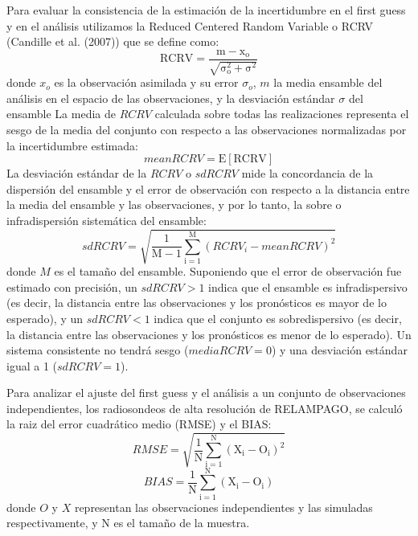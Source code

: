 \documentclass[12pt,twoside]{reedthesis}
\begin{document}
Para evaluar la consistencia de la estimación de la incertidumbre en el first guess y en el análisis utilizamos la Reduced Centered Random Variable o RCRV (Candille et al. (2007)) que se define como:
\begin{equation}
  \mathrm{RCRV = \frac{m - x_o}{\sqrt{\sigma_o^2 + \sigma^2}}}
  \label{eq:eq6}
\end{equation}
donde \(x_o\) es la observación asimilada y su error \(\sigma_o\), \(m\) la media ensamble del análisis en el espacio de las observaciones, y la desviación estándar \(\sigma\) del ensamble
La media de \(RCRV\) calculada sobre todas las realizaciones representa el sesgo de la media del conjunto con respecto a las observaciones normalizadas por la incertidumbre estimada:
\begin{equation}
  \mathrm{\mathit{mean RCRV} = E[RCRV]}
  \label{eq:eq7}
\end{equation}
La desviación estándar de la \(RCRV\) o \(sd RCRV\) mide la concordancia de la dispersión del ensamble y el error de observación con respecto a la distancia entre la media del ensamble y las observaciones, y por lo tanto, la sobre o infradispersión sistemática del ensamble:
\begin{equation}
  \mathrm{\mathit{sd RCRV} = \sqrt{\frac{1}{M -1}\sum_{i=1}^{M}(\mathit{RCRV_i} - \mathit{mean RCRV})^2}}
  \label{eq:eq8}
\end{equation}
donde \(M\) es el tamaño del ensamble. Suponiendo que el error de observación fue estimado con precisión, un \(sd RCRV > 1\) indica que el ensamble es infradispersivo (es decir, la distancia entre las observaciones y los pronósticos es mayor de lo esperado), y un \(sd RCRV < 1\) indica que el conjunto es sobredispersivo (es decir, la distancia entre las observaciones y los pronósticos es menor de lo esperado). Un sistema consistente no tendrá sesgo (\(media RCRV = 0\)) y una desviación estándar igual a 1 (\(sd RCRV = 1\)).

Para analizar el ajuste del first guess y el análisis a un conjunto de observaciones independientes, los radiosondeos de alta resolución de RELAMPAGO, se calculó la raiz del error cuadrático medio (RMSE) y el BIAS:
\begin{equation}
  \mathrm{\mathit{RMSE} = \sqrt{\frac{1}{N}\sum_{i = 1}^{N} (X_i - O_i)^{2}}}
  \label{eq:eq9}
\end{equation}
\begin{equation}
  \mathrm{\mathit{BIAS} = \frac{1}{N}\sum_{i = 1}^{N} (X_i - O_i)}
  \label{eq:eq10}
\end{equation}
donde \(O\) y \(X\) representan las observaciones independientes y las simuladas respectivamente, y N es el tamaño de la muestra.
\end{document}
